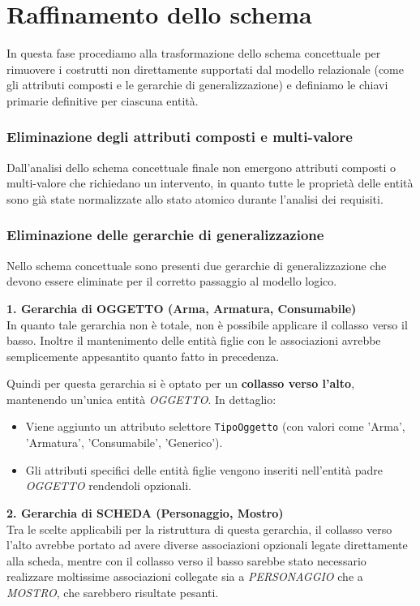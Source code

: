\documentclass[a4paper,12pt]{report}
\begin{document}
\section{Raffinamento dello schema}

In questa fase procediamo alla trasformazione dello schema concettuale per rimuovere i costrutti non direttamente supportati dal modello relazionale (come gli attributi composti e le gerarchie di generalizzazione) e definiamo le chiavi primarie definitive per ciascuna entità.

\subsubsection{Eliminazione degli attributi composti e multi-valore}
Dall'analisi dello schema concettuale finale non emergono attributi composti o multi-valore che richiedano un intervento, in quanto tutte le proprietà delle entità sono già state normalizzate allo stato atomico durante l'analisi dei requisiti.

\subsubsection{Eliminazione delle gerarchie di generalizzazione}
Nello schema concettuale sono presenti due gerarchie di generalizzazione che devono essere eliminate per il corretto passaggio al modello logico.

\textbf{1. Gerarchia di OGGETTO (Arma, Armatura, Consumabile)} \\
In quanto tale gerarchia non è totale, non è possibile applicare il collasso verso il basso. Inoltre il mantenimento delle entità figlie con le associazioni avrebbe semplicemente appesantito quanto fatto in precedenza.

Quindi per questa gerarchia si è optato per un \textbf{collasso verso l'alto}, mantenendo un'unica entità \textit{OGGETTO}. In dettaglio:
\begin{itemize}
    \item Viene aggiunto un attributo selettore \texttt{TipoOggetto} (con valori come 'Arma', 'Armatura', 'Consumabile', 'Generico').
    \item Gli attributi specifici delle entità figlie vengono inseriti nell'entità padre \textit{OGGETTO} rendendoli opzionali.
\end{itemize}

\textbf{2. Gerarchia di SCHEDA (Personaggio, Mostro)} \\
Tra le scelte applicabili per la ristruttura di questa gerarchia, il collasso verso l'alto avrebbe portato ad avere diverse associazioni opzionali legate direttamente alla scheda, mentre con il collasso verso il basso sarebbe stato necessario realizzare moltissime associazioni collegate sia a \textit{PERSONAGGIO} che a \textit{MOSTRO}, che sarebbero risultate pesanti.
\end{document}
